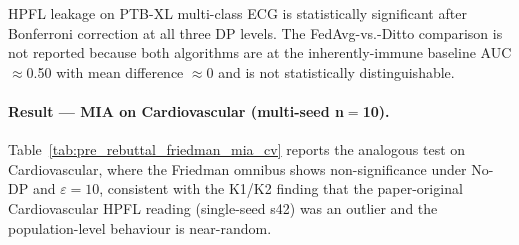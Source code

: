 \documentclass[conference]{IEEEtran}
\begin{document}
\begin{table}[htbp]
\centering
\caption{Friedman $\chi^2$ omnibus and Bonferroni-corrected pairwise Wilcoxon for MIA AUC on PTB-XL across three DP levels, multi-seed $n{=}10$. Bonferroni $\alpha_{\text{single}}{=}0.0167$ ($=0.05/3$ pairs). Survival of the correction is marked with~$\star\star$.}
\label{tab:pre_rebuttal_friedman_mia}
\small
\setlength{\tabcolsep}{4pt}

\vspace{1mm}
\footnotesize{HPFL leakage on PTB-XL multi-class ECG is statistically significant after Bonferroni correction at all three DP levels. The FedAvg-vs.-Ditto comparison is not reported because both algorithms are at the inherently-immune baseline AUC$\approx$0.50 with mean difference $\approx 0$ and is not statistically distinguishable.}
\end{table}

\paragraph{Result --- MIA on Cardiovascular (multi-seed n$=$10).} Table~\ref{tab:pre_rebuttal_friedman_mia_cv} reports the analogous test on Cardiovascular, where the Friedman omnibus shows non-significance under No-DP and $\varepsilon{=}10$, consistent with the K1/K2 finding that the paper-original Cardiovascular HPFL reading (single-seed s42) was an outlier and the population-level behaviour is near-random.
\end{document}

